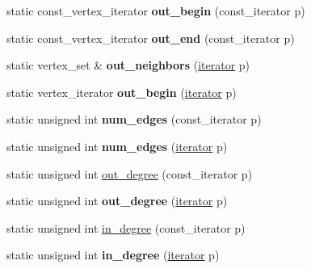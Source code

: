 \begin{DoxyCompactItemize}
static const\+\_\+vertex\+\_\+iterator {\bfseries out\+\_\+begin} (const\+\_\+iterator p)
\item 
\mbox{\label{class_n_graph_1_1t_graph_af485a8c7b28e7aa81fbc7cf65316dc21}} 
static const\+\_\+vertex\+\_\+iterator {\bfseries out\+\_\+end} (const\+\_\+iterator p)
\item 
\mbox{\label{class_n_graph_1_1t_graph_aab1fb0576d1eb5604779bf0f7ad6d60d}} 
static vertex\+\_\+set \& {\bfseries out\+\_\+neighbors} (\mbox{\hyperlink{class_n_graph_1_1t_graph_a6e446a33b74e5c0c39fb6c50a4f07cec}{iterator}} p)
\item 
\mbox{\label{class_n_graph_1_1t_graph_a8c782dadf12b75e66f8db04c60763cbe}} 
static vertex\+\_\+iterator {\bfseries out\+\_\+begin} (\mbox{\hyperlink{class_n_graph_1_1t_graph_a6e446a33b74e5c0c39fb6c50a4f07cec}{iterator}} p)
\item 
\mbox{\label{class_n_graph_1_1t_graph_a1a850ec5708546dfca02d8a78d41a878}} 
static unsigned int {\bfseries num\+\_\+edges} (const\+\_\+iterator p)
\item 
\mbox{\label{class_n_graph_1_1t_graph_a988ba97d4db2eaa9d9e0ef28658f0d8d}} 
static unsigned int {\bfseries num\+\_\+edges} (\mbox{\hyperlink{class_n_graph_1_1t_graph_a6e446a33b74e5c0c39fb6c50a4f07cec}{iterator}} p)
\item 
static unsigned int \mbox{\hyperlink{class_n_graph_1_1t_graph_acd67259b93d9ec2de6ca03bf19e027bd}{out\+\_\+degree}} (const\+\_\+iterator p)
\item 
\mbox{\label{class_n_graph_1_1t_graph_a855dcfd91171425d09a60593bd222a2b}} 
static unsigned int {\bfseries out\+\_\+degree} (\mbox{\hyperlink{class_n_graph_1_1t_graph_a6e446a33b74e5c0c39fb6c50a4f07cec}{iterator}} p)
\item 
static unsigned int \mbox{\hyperlink{class_n_graph_1_1t_graph_a5c269fb5cb63c82496bb9c59d6c289b1}{in\+\_\+degree}} (const\+\_\+iterator p)
\item 
\mbox{\label{class_n_graph_1_1t_graph_addc7a2aa0c3aa9b2c21cf50b27ec0d63}} 
static unsigned int {\bfseries in\+\_\+degree} (\mbox{\hyperlink{class_n_graph_1_1t_graph_a6e446a33b74e5c0c39fb6c50a4f07cec}{iterator}} p)

\end{DoxyCompactItemize}
